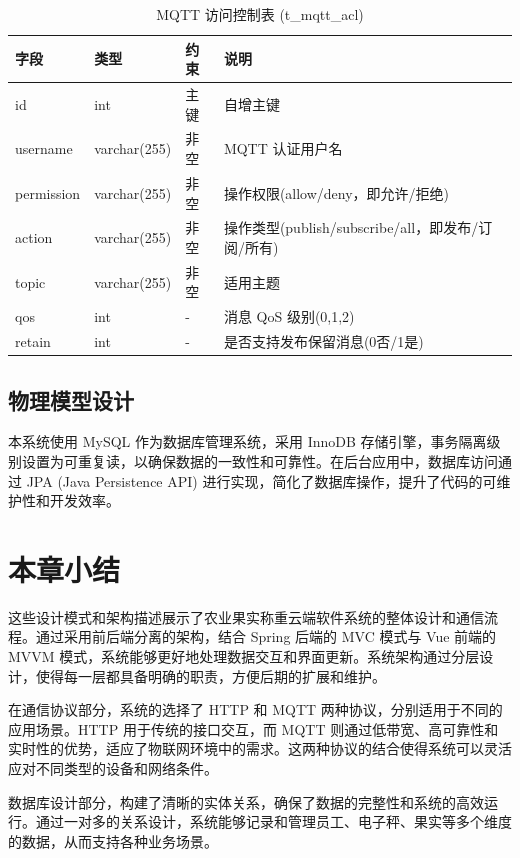 \begin{table}[H]
\centering
\caption{MQTT 访问控制表 (t\_mqtt\_acl)}
\begin{tabular}{|l|l|l|l|}
\hline
字段 & 类型 & 约束 & 说明 \\
\hline
id & int & 主键 & 自增主键 \\
username & varchar(255) & 非空 & MQTT 认证用户名 \\
permission & varchar(255) & 非空 & 操作权限(allow/deny，即允许/拒绝) \\
action & varchar(255) & 非空 & 操作类型(publish/subscribe/all，即发布/订阅/所有) \\
topic & varchar(255) & 非空 & 适用主题 \\
qos & int & - & 消息 QoS 级别(0,1,2) \\
retain & int & - & 是否支持发布保留消息(0否/1是) \\
\hline
\end{tabular}
\end{table}

\subsection{物理模型设计}

本系统使用 MySQL 作为数据库管理系统，采用 InnoDB 存储引擎，事务隔离级别设置为可重复读，以确保数据的一致性和可靠性。在后台应用中，数据库访问通过 JPA (Java Persistence API) 进行实现，简化了数据库操作，提升了代码的可维护性和开发效率。

\section{本章小结}

这些设计模式和架构描述展示了农业果实称重云端软件系统的整体设计和通信流程。通过采用前后端分离的架构，结合 Spring 后端的 MVC 模式与 Vue 前端的 MVVM 模式，系统能够更好地处理数据交互和界面更新。系统架构通过分层设计，使得每一层都具备明确的职责，方便后期的扩展和维护。

在通信协议部分，系统的选择了 HTTP 和 MQTT 两种协议，分别适用于不同的应用场景。HTTP 用于传统的接口交互，而 MQTT 则通过低带宽、高可靠性和实时性的优势，适应了物联网环境中的需求。这两种协议的结合使得系统可以灵活应对不同类型的设备和网络条件。

数据库设计部分，构建了清晰的实体关系，确保了数据的完整性和系统的高效运行。通过一对多的关系设计，系统能够记录和管理员工、电子秤、果实等多个维度的数据，从而支持各种业务场景。
